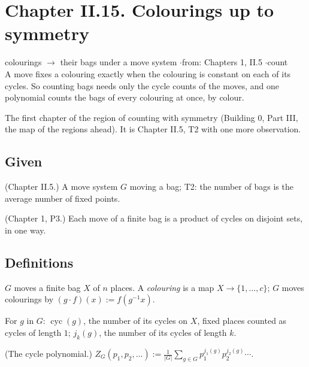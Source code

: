 \section*{Chapter II.15. Colourings up to symmetry}
\begin{center}
{\normalsize colourings $\to$ their bags under a move system \quad$\cdot$\quad from: Chapters 1, II.5 \quad$\cdot$\quad count}\\[4pt]
{\small A move fixes a colouring exactly when the colouring is constant on each of its cycles. So counting bags needs only the cycle counts of the moves, and one polynomial counts the bags of every colouring at once, by colour.}
\end{center}

The first chapter of the region of counting with symmetry (Building 0, Part III, the map of the regions ahead). It is Chapter II.5, T2 with one more observation.

\subsection*{Given}

\begin{lines}
\item[\lab{G1}] (Chapter II.5.) A move system $G$ moving a bag; T2: the number of bags is the average number of fixed points.
\item[\lab{G2}] (Chapter 1, P3.) Each move of a finite bag is a product of cycles on disjoint sets, in one way.
\end{lines}

\subsection*{Definitions}

\begin{lines}
\item[\lab{D1}] $G$ moves a finite bag $X$ of $n$ places. A \emph{colouring} is a map $X \to \{1, \dots, c\}$; $G$ moves colourings by $(g \cdot f)(x) := f(g^{-1}x)$.
\item[\lab{D2}] For $g$ in $G$: $\operatorname{cyc}(g)$, the number of its cycles on $X$, fixed places counted as cycles of length $1$; $j_k(g)$, the number of its cycles of length $k$.
\item[\lab{D3}] (The cycle polynomial.) $Z_G(p_1, p_2, \dots) := \frac{1}{|G|} \sum_{g \in G} p_1^{j_1(g)} p_2^{j_2(g)} \cdots$.
\end{lines}

